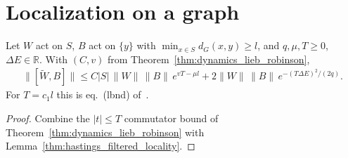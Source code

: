 \section{Localization on a graph}
\label{sec:gaussian_filtered_local_projective_form}

\begin{lemma}
    \label{thm:hastings05_filtered_locality_graph}
    \leanok
    Let $W$ act on $S$, $B$ act on $\{y\}$ with $\min_{x\in S}d_G(x,y)\ge l$,
    and $q,\mu,T\ge0$, $\Delta E\in\mathbb R$. With $(C,v)$ from
    Theorem~\ref{thm:dynamics_lieb_robinson},
    \begin{align}
        \|[\widetilde W,B]\|\le C|S|\,\|W\|\,\|B\|\,e^{vT-\mu l}
        +2\|W\|\,\|B\|\,e^{-(T\Delta E)^2/(2q)}.
        \label{eq:hastings05_filtered_graph_commutator}
    \end{align}
    For $T=c_1l$ this is eq.~(lbnd) of~\cite[lines 266--283]{Hastings2006Solving}.
\end{lemma}
\begin{proof}\leanok
    Combine the $|t|\le T$ commutator bound of
    Theorem~\ref{thm:dynamics_lieb_robinson} with
    Lemma~\ref{thm:hastings_filtered_locality}.
\end{proof}

